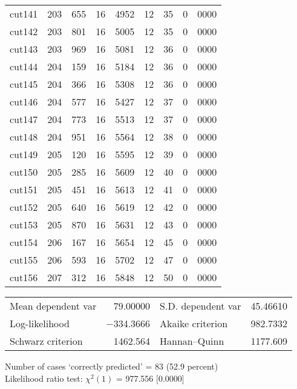\documentclass[11pt]{article}
\begin{document}
\begin{center}
\begin{tabular}{lr@{.}lr@{.}lr@{.}lr@{.}l}
cut141 &
  203&655 &
    16&4952 &
      12&35 &
        0&0000 \\
cut142 &
  203&801 &
    16&5005 &
      12&35 &
        0&0000 \\
cut143 &
  203&969 &
    16&5081 &
      12&36 &
        0&0000 \\
cut144 &
  204&159 &
    16&5184 &
      12&36 &
        0&0000 \\
cut145 &
  204&366 &
    16&5308 &
      12&36 &
        0&0000 \\
cut146 &
  204&577 &
    16&5427 &
      12&37 &
        0&0000 \\
cut147 &
  204&773 &
    16&5513 &
      12&37 &
        0&0000 \\
cut148 &
  204&951 &
    16&5564 &
      12&38 &
        0&0000 \\
cut149 &
  205&120 &
    16&5595 &
      12&39 &
        0&0000 \\
cut150 &
  205&285 &
    16&5609 &
      12&40 &
        0&0000 \\
cut151 &
  205&451 &
    16&5613 &
      12&41 &
        0&0000 \\
cut152 &
  205&640 &
    16&5619 &
      12&42 &
        0&0000 \\
cut153 &
  205&870 &
    16&5631 &
      12&43 &
        0&0000 \\
cut154 &
  206&167 &
    16&5654 &
      12&45 &
        0&0000 \\
cut155 &
  206&593 &
    16&5702 &
      12&47 &
        0&0000 \\
cut156 &
  207&312 &
    16&5848 &
      12&50 &
        0&0000 \\
\end{tabular}

\vspace{1ex}
\begin{tabular}{lrlr}
Mean dependent var &  79.00000 & S.D. dependent var &  45.46610 \\
Log-likelihood & $-$334.3666 & Akaike criterion &  982.7332 \\
Schwarz criterion &  1462.564 & Hannan--Quinn &  1177.609 \\
\end{tabular}


\vspace{1ex}
\vspace{1em}
\begin{raggedright}
Number of cases `correctly predicted' = 83 (52.9 percent)\\
Likelihood ratio test: $\chi^2(1)$ = 977.556 [0.0000]\\
\end{raggedright}

\end{center}
\end{document}
